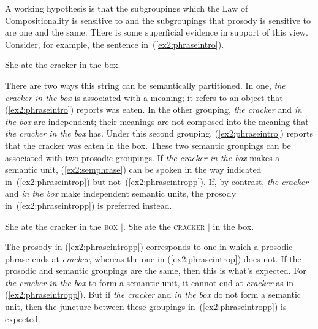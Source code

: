 A working hypothesis is that the subgroupings which the Law of Compositionality is sensitive to and the subgroupings that prosody is sensitive to are one and the same. There is some superficial evidence in support of this view. Consider, for example, the sentence in~(\ref{ex2:phraseintro}).
\begin{exe}
	\ex \label{ex2:phraseintro} She ate the cracker in the box.
\end{exe}
There are two ways this string can be semantically partitioned. In one, \emph{the cracker in the box} is associated with a meaning; it refers to an object that (\ref{ex2:phraseintro}) reports was eaten. In the other grouping, \emph{the cracker} and \emph{in the box} are independent; their meanings are not composed into the meaning that \emph{the cracker in the box} has. Under this second grouping, (\ref{ex2:phraseintro}) reports that the cracker was eaten in the box. These two semantic groupings can be associated with two prosodic groupings. If \emph{the cracker in the box} makes a semantic unit, (\ref{ex2:semphrase}) can be spoken in the way indicated in~(\ref{ex2:phraseintrop}) but not~(\ref{ex2:phraseintropp}). If, by contrast, \emph{the cracker} and \emph{in the box} make independent semantic units, the prosody in~(\ref{ex2:phraseintropp}) is preferred instead.
\begin{exe}
	\ex \label{ex2:phraseintroc} 
	\begin{xlist}
		\ex \label{ex2:phraseintrop} She ate the cracker in the \textsc{box} $|$.
		\ex \label{ex2:phraseintropp} She ate the \textsc{cracker} $|$ in the box.
	\end{xlist}
\end{exe}
The prosody in (\ref{ex2:phraseintropp}) corresponds to one in which a prosodic phrase ends at \emph{cracker}, whereas the one in (\ref{ex2:phraseintrop}) does not. If the prosodic and semantic groupings are the same, then this is what's expected. For \emph{the cracker in the box} to form a semantic unit, it cannot end at \emph{cracker} as in (\ref{ex2:phraseintropp}). But if \emph{the cracker} and \emph{in the box} do not form a semantic unit, then the juncture between these groupings in~(\ref{ex2:phraseintropp}) is expected.

